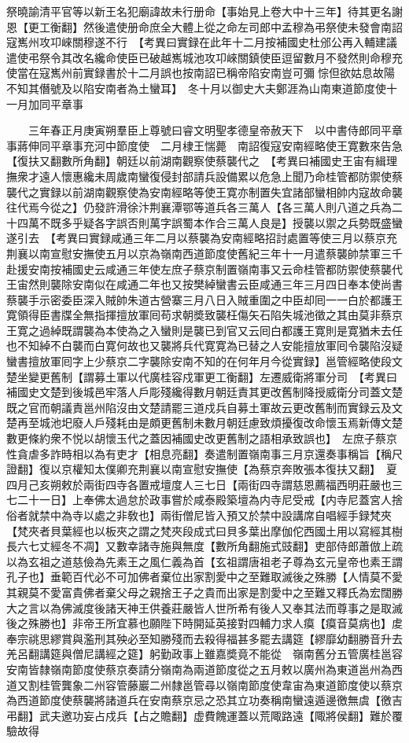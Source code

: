 祭曉諭清平官等以新王名犯廟諱故未行册命【事始見上卷大中十三年】待其更名謝恩【更工衡翻】然後遣使册命庶全大體上從之命左司郎中孟穆為弔祭使未發會南詔寇嶲州攻卭崍關穆遂不行　【考異曰實録在此年十二月按補國史杜邠公再入輔建議遣使弔祭令其改名纔命使臣已破越嶲城池攻卭崍關鎮使臣逗留數月不發然則命穆充使當在寇嶲州前實録書於十二月誤也按南詔已稱帝陷安南豈可彌悰但欲姑息故陽不知其僭號及以陷安南者為土蠻耳】　冬十月以御史大夫鄭涯為山南東道節度使十一月加同平章事

　　三年春正月庚寅朔羣臣上尊號曰睿文明聖孝德皇帝赦天下　以中書侍郎同平章事蔣伸同平章事充河中節度使　二月棣王惴薨　南詔復寇安南經略使王寛數來告急【復扶又翻數所角翻】朝廷以前湖南觀察使蔡襲代之　【考異曰補國史王宙有緝理撫衆才遠人懷惠纔未周歲南蠻復侵封部請兵設備累以危急上聞乃命桂管都防禦使蔡襲代之實録以前湖南觀察使為安南經略等使王寛亦制置失宜諸部蠻相帥内寇故命襲往代焉今從之】仍發許滑徐汴荆襄潭鄂等道兵各三萬人【各三萬人則八道之兵為二十四萬不既多乎疑各字誤否則萬字誤蜀本作合三萬人良是】授襲以禦之兵勢既盛蠻遂引去　【考異曰實録咸通三年二月以蔡襲為安南經略招討處置等使三月以蔡京充荆襄以南宣慰安撫使五月以京為嶺南西道節度使舊紀三年十一月遣蔡襲帥禁軍三千赴援安南按補國史云咸通三年使左庶子蔡京制置嶺南事又云命桂管都防禦使蔡襲代王宙然則襲除安南似在咸通二年也又按樊綽蠻書云臣咸通三年三月四日奉本使尚書蔡襲手示密委臣深入賊帥朱道古營寨三月八日入賊重圍之中臣却囘一一白於都護王寛領得臣書牒全無指揮擅放軍囘苟求朝奬致襲枉傷矢石陷失城池徵之其由莫非蔡京王寛之過綽既謂襲為本使為之入蠻則是襲已到官又云囘白都護王寛則是寛猶未去任也不知綽不白襲而白寛何故也又襲將兵代寛寛為已替之人安能擅放軍囘令襲陷沒疑蠻書擅放軍囘字上少蔡京二字襲除安南不知的在何年月今從實録】邕管經略使段文楚坐變更舊制【謂募土軍以代廣桂容戍軍更工衡翻】左遷威衛將軍分司　【考異曰補國史文楚到後城邑牢落人戶彫殘纔得數月朝廷責其更改舊制降授威衛分司蓋文楚既之官而朝議責邕州陷沒由文楚請罷三道戍兵自募土軍故云更改舊制而實録云及文楚再至城池圯廢人戶殘耗由是頗更舊制未數月朝廷慮致煩擾復改命懷玉焉新傳文楚數更條約衆不悦以胡懷玉代之蓋因補國史改更舊制之語相承致誤也】　左庶子蔡京性貪虐多詐時相以為有吏才【相息亮翻】奏遣制置嶺南事三月京還奏事稱旨【稱尺證翻】復以京權知太僕卿充荆襄以南宣慰安撫使【為蔡京奔敗張本復扶又翻】　夏四月己亥朔敕於兩街四寺各置戒壇度人三七日【兩街四寺謂慈恩薦福西明莊嚴也三七二十一日】上奉佛太過怠於政事嘗於咸泰殿築壇為内寺尼受戒【内寺尼蓋宮人捨俗者就禁中為寺以處之非敎也】兩街僧尼皆入預又於禁中設講席自唱經手録梵夾【梵夾者貝葉經也以板夾之謂之梵夾段成式曰貝多葉出摩伽佗西國土用以寫經其樹長六七丈經冬不凋】又數幸諸寺施與無度【數所角翻施式豉翻】吏部侍郎蕭倣上疏以為玄祖之道慈儉為先素王之風仁義為首【玄祖謂唐祖老子尊為玄元皇帝也素王謂孔子也】垂範百代必不可加佛者棄位出家割愛中之至難取滅後之殊勝【人情莫不愛其親莫不愛富貴佛者棄父母之親捨王子之貴而出家是割愛中之至難又釋氏為宏闊勝大之言以為佛滅度後諸天神王供養莊嚴皆人世所希有後人又奉其法而尊事之是取滅後之殊勝也】非帝王所宜慕也願陛下時開延英接對四輔力求人瘼【瘼音莫病也】䖍奉宗祧思繆賞與濫刑其殃必至知勝殘而去殺得福甚多罷去講筵【繆靡幼翻勝音升去羌呂翻講筵與僧尼講經之筵】躬勤政事上雖嘉奬竟不能從　嶺南舊分五管廣桂邕容安南皆隸嶺南節度使蔡京奏請分嶺南為兩道節度從之五月敕以廣州為東道邕州為西道又割桂管龔象二州容管藤巖二州隸邕管尋以嶺南節度使韋宙為東道節度使以蔡京為西道節度使蔡襲將諸道兵在安南蔡京忌之恐其立功奏稱南蠻遠遁邊徼無虞【徼吉弔翻】武夫邀功妄占戍兵【占之贍翻】虚費餽運蓋以荒陬路遠【陬將侯翻】難於覆驗故得